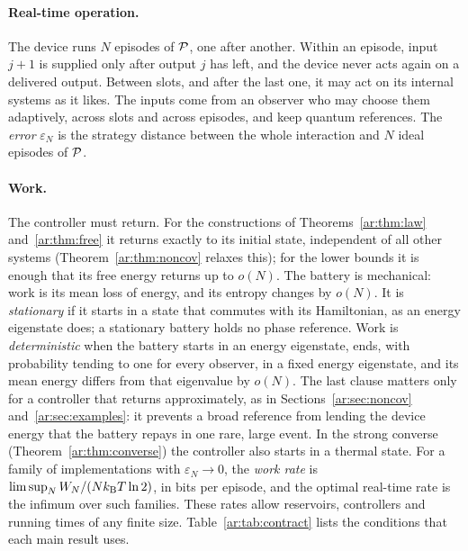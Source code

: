 \paragraph{Real-time operation.} The device runs $N$ episodes of $\mathcal P$, one after another. Within an episode, input $j+1$ is supplied only after output $j$ has left, and the device never acts again on a delivered output. Between slots, and after the last one, it may act on its internal systems as it likes. The inputs come from an observer who may choose them adaptively, across slots and across episodes, and keep quantum references. The \emph{error} $\varepsilon_N$ is the strategy distance between the whole interaction and $N$ ideal episodes of $\mathcal P$.

\paragraph{Work.} The controller must return. For the constructions of Theorems~\ref{ar:thm:law} and~\ref{ar:thm:free} it returns exactly to its initial state, independent of all other systems (Theorem~\ref{ar:thm:noncov} relaxes this); for the lower bounds it is enough that its free energy returns up to $o(N)$. The battery is mechanical: work is its mean loss of energy, and its entropy changes by $o(N)$. It is \emph{stationary} if it starts in a state that commutes with its Hamiltonian, as an energy eigenstate does; a stationary battery holds no phase reference. Work is \emph{deterministic} when the battery starts in an energy eigenstate, ends, with probability tending to one for every observer, in a fixed energy eigenstate, and its mean energy differs from that eigenvalue by $o(N)$. The last clause matters only for a controller that returns approximately, as in Sections~\ref{ar:sec:noncov} and~\ref{ar:sec:examples}: it prevents a broad reference from lending the device energy that the battery repays in one rare, large event. In the strong converse (Theorem~\ref{ar:thm:converse}) the controller also starts in a thermal state. For a family of implementations with $\varepsilon_N\to0$, the \emph{work rate} is $\limsup_NW_N/(Nk_{\mathrm B} T\ln2)$, in bits per episode, and the optimal real-time rate is the infimum over such families. These rates allow reservoirs, controllers and running times of any finite size. Table~\ref{ar:tab:contract} lists the conditions that each main result uses.

